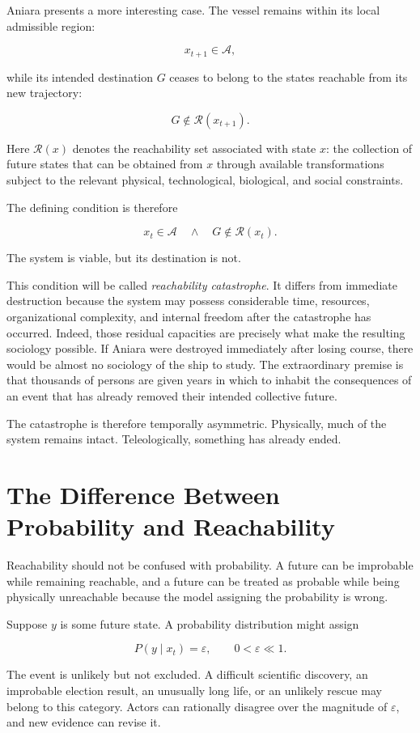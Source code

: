 \documentclass[11pt,oneside]{book}
\theoremstyle{definition}
\theoremstyle{remark}
\newcommand{\A}{\mathcal{A}}
\newcommand{\R}{\mathcal{R}}
\begin{document}
Aniara presents a more interesting case. The vessel remains within its local admissible region:

\[
x_{t+1} \in \A,
\]

while its intended destination \(G\) ceases to belong to the states reachable from its new trajectory:

\[
G \notin \R(x_{t+1}).
\]

Here \(\R(x)\) denotes the reachability set associated with state \(x\): the collection of future states that can be obtained from \(x\) through available transformations subject to the relevant physical, technological, biological, and social constraints.

The defining condition is therefore

\[
\boxed{
x_t\in\A
\quad\land\quad
G\notin\R(x_t).
}
\]

The system is viable, but its destination is not.

This condition will be called \emph{reachability catastrophe}. It differs from immediate destruction because the system may possess considerable time, resources, organizational complexity, and internal freedom after the catastrophe has occurred. Indeed, those residual capacities are precisely what make the resulting sociology possible. If Aniara were destroyed immediately after losing course, there would be almost no sociology of the ship to study. The extraordinary premise is that thousands of persons are given years in which to inhabit the consequences of an event that has already removed their intended collective future.

The catastrophe is therefore temporally asymmetric. Physically, much of the system remains intact. Teleologically, something has already ended.

\section{The Difference Between Probability and Reachability}

Reachability should not be confused with probability. A future can be improbable while remaining reachable, and a future can be treated as probable while being physically unreachable because the model assigning the probability is wrong.

Suppose \(y\) is some future state. A probability distribution might assign

\[
P(y\mid x_t)=\varepsilon,
\qquad
0<\varepsilon\ll1.
\]

The event is unlikely but not excluded. A difficult scientific discovery, an improbable election result, an unusually long life, or an unlikely rescue may belong to this category. Actors can rationally disagree over the magnitude of \(\varepsilon\), and new evidence can revise it.
\end{document}

